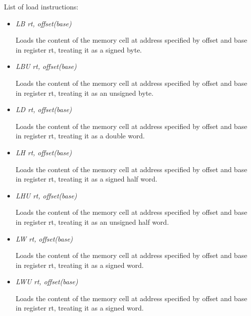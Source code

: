 \documentclass[letterpaper,10pt,english]{sphinxmanual}
\begin{document}
List of load instructions:
\begin{itemize}
\item {} 
\emph{LB rt, offset(base)}

Loads the content of the memory cell at address specified by offset and base in register rt, treating it as a signed byte.

\item {} 
\emph{LBU rt, offset(base)}

Loads the content of the memory cell at address specified by offset and base in register rt, treating it as an unsigned byte.

\item {} 
\emph{LD rt, offset(base)}

Loads the content of the memory cell at address specified by offset and base in register rt, treating it as a double word.

\item {} 
\emph{LH rt, offset(base)}

Loads the content of the memory cell at address specified by offset and base in register rt, treating it as a signed half word.

\item {} 
\emph{LHU rt, offset(base)}

Loads the content of the memory cell at address specified by offset and base in register rt, treating it as an unsigned half word.

\item {} 
\emph{LW rt, offset(base)}

Loads the content of the memory cell at address specified by offset and base in register rt, treating it as a signed word.

\item {} 
\emph{LWU rt, offset(base)}

Loads the content of the memory cell at address specified by offset and base in register rt, treating it as a signed word.

\end{itemize}
\end{document}
